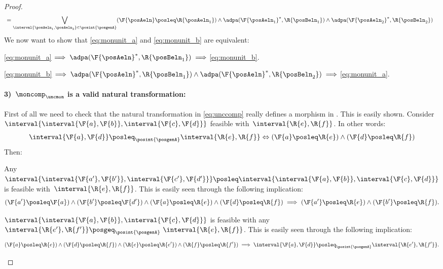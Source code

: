 \begin{proof}
\begin{equation}
\begin{aligned}
        &=\bigvee_{\interval{\posAeln_1,\posAeln_2}\in \posint{\posgenA}} (\F{\posAeln}\posleq \R{\posAeln_1})\wedge \adpa(\F{\posAeln_1}^*,\R{\posBeln_1})\wedge \adpa(\F{\posAeln_2}^*,\R{\posBeln_2})
      \end{aligned}
  \end{equation}
  We now want to show that \cref{eq:monunit_a} and \cref{eq:monunit_b} are equivalent:
  \begin{compactitem}
  \item \cref{eq:monunit_a}$\implies \adpa(\F{\posAeln}^*,\R{\posBeln_1}) \implies$\cref{eq:monunit_b}.
  \item \cref{eq:monunit_b}$\implies\adpa(\F{\posAeln}^*,\R{\posBeln_1})\wedge \adpa(\F{\posAeln}^*,\R{\posBeln_2})\implies$\cref{eq:monunit_a}.
  \end{compactitem}
  \paragraph*{3)~$\moncomp_\uncmon$ is a valid natural transformation:}
  First of all we need to check that the natural transformation in \cref{eq:unccomp} really defines a morphism in \DP.
  This is easily shown. Consider~$\interval{\interval{\F{a},\F{b}},\interval{\F{c},\F{d}}}$ feasible with~$\interval{\R{e},\R{f}}$.
  In other words:
  \begin{equation}
  \interval{\F{a},\F{d}}\posleq_{\posint{\posgenA}}\interval{\R{e},\R{f}}\Leftrightarrow (\F{a}\posleq \R{e}) \wedge (\F{d}\posleq \R{f})
  \end{equation}
  Then:
  \begin{compactitem}
  \item Any~$\interval{\interval{\F{a'},\F{b'}},\interval{\F{c'},\F{d'}}}\posleq \interval{\interval{\F{a},\F{b}},\interval{\F{c},\F{d}}}$ is feasible with~$\interval{\R{e},\R{f}}$.
  This is easily seen through the following implication:
  \begin{equation}
  (\F{a'}\posleq \F{a})\wedge (\F{b'}\posleq \F{d'}) \wedge (\F{a}\posleq \R{e}) \wedge (\F{d}\posleq \R{f})\implies (\F{a'}\posleq \R{e}) \wedge (\F{b'}\posleq \R{f}).
  \end{equation}
  \item $\interval{\interval{\F{a},\F{b}},\interval{\F{c},\F{d}}}$ is feasible with any~$\interval{\R{e'},\R{f'}}\posgeq_{\posint{\posgenA}} ~\interval{\R{e},\R{f}}$.
  This is easily seen through the following implication:
  \begin{equation}
  (\F{a}\posleq \R{e}) \wedge (\F{d}\posleq \R{f}) \wedge (\R{e}\posleq \R{e'})\wedge (\R{f}\posleq \R{f'})\implies \interval{\F{a},\F{d}}\posleq_{\posint{\posgenA}}\interval{\R{e'},\R{f'}}.

\end{equation}
\end{compactitem}
\end{proof}
